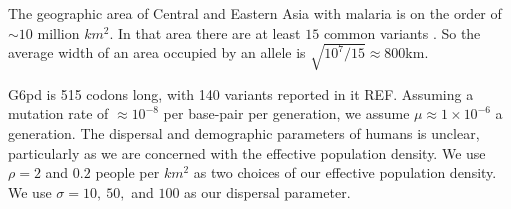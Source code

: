 \documentclass{article}
\begin{document}







The geographic area of Central and Eastern Asia with malaria is on the
order of $\sim 10$ million $km^2$. In that area there are at least $15$
common variants \citep{Howes-g6pd-variants}. So the average width of
an area occupied by an allele is $\sqrt{10^7/15} \approx  800$km. 


G6pd is 515 codons long, with 140 variants reported in it REF. Assuming a
mutation rate of $\approx 10^{-8}$ per base-pair per generation, we assume
$\mu \approx 1 \times 10^{-6}$ a generation. 
The dispersal and demographic parameters of humans is unclear,
particularly as we are concerned with the effective population density.
We use $\rho=2$ and $0.2$ people per $km^2$ as two choices of our effective population density.
We use $\sigma=10,~50,$ and $100$ as our dispersal parameter.
\end{document}
